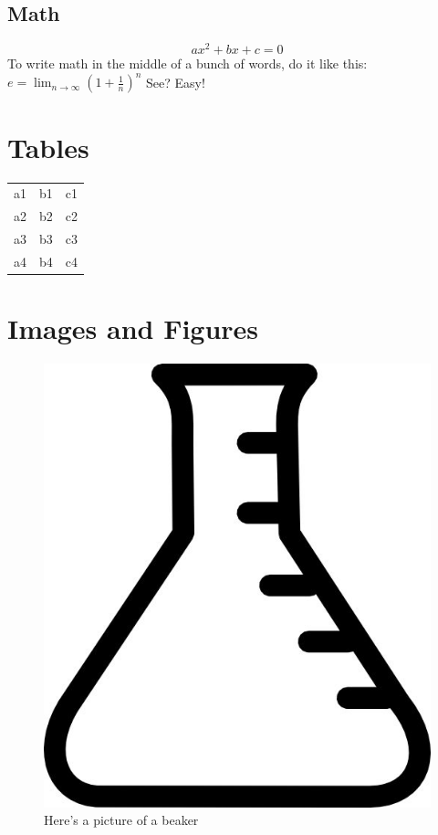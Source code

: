 \documentclass[11pt]{article} %
\begin{document}
\subsection{Math}
\[ax^2 + bx + c = 0\] %
To write math in the middle of a bunch of words, do it like this: $e=\lim_{n\to\infty}\left(1+\frac{1}{n}\right)^n$ See? Easy!

\section{Tables}
\begin{center}
\begin{tabular}{|r|c l|} %
	\hline %
	a1 & b1 & c1 \\ %
	a2 & b2 & c2 \\
	a3 & b3 & c3 \\
	\hline
	a4 & b4 & c4 \\
	\hline
\end{tabular}
\end{center}

\section{Images and Figures}
\begin{figure}[h] %
\begin{center}
	\includegraphics[scale=0.1]{beaker} %
\end{center}
\caption{Here's a picture of a beaker}
\end{figure}
\end{document}
